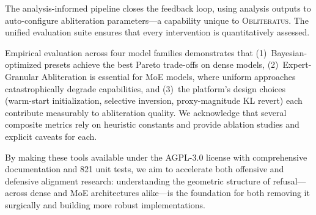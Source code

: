 \documentclass[11pt]{article}
\begin{document}
The analysis-informed pipeline closes the feedback loop, using analysis outputs to auto-configure abliteration parameters---a capability unique to \textsc{Obliteratus}. The unified evaluation suite ensures that every intervention is quantitatively assessed.

Empirical evaluation across four model families demonstrates that (1)~Bayesian-optimized presets achieve the best Pareto trade-offs on dense models, (2)~Expert-Granular Abliteration is essential for MoE models, where uniform approaches catastrophically degrade capabilities, and (3)~the platform's design choices (warm-start initialization, selective inversion, proxy-magnitude KL revert) each contribute measurably to abliteration quality. We acknowledge that several composite metrics rely on heuristic constants and provide ablation studies and explicit caveats for each.

By making these tools available under the AGPL-3.0 license with comprehensive documentation and 821 unit tests, we aim to accelerate both offensive and defensive alignment research: understanding the geometric structure of refusal---across dense and MoE architectures alike---is the foundation for both removing it surgically and building more robust implementations.



\end{document}
